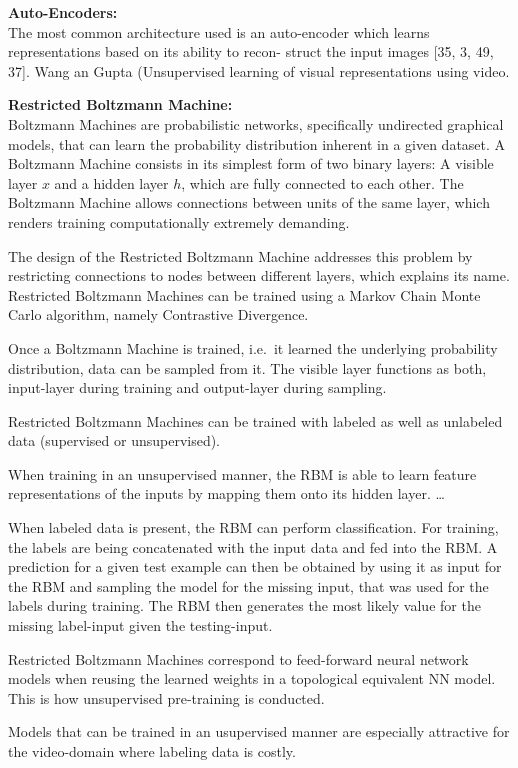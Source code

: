 \textbf{Auto-Encoders:}\\
The most common architecture used is an auto-encoder
which learns representations based on its ability to recon-
struct the input images [35, 3, 49, 37]. Wang an Gupta (Unsupervised learning of visual representations using video.

\textbf{Restricted Boltzmann Machine:}\\
Boltzmann Machines are probabilistic networks, specifically undirected graphical models, that can learn the probability distribution inherent in a given dataset.
A Boltzmann Machine consists in its simplest form of two binary layers: A visible layer $x$ and a hidden layer $h$, which are fully connected to each other.
The Boltzmann Machine allows connections between units of the same layer, which renders training computationally extremely demanding.

The design of the Restricted Boltzmann Machine addresses this problem by restricting connections to nodes between different layers, which explains its name.
Restricted Boltzmann Machines can be trained using a Markov Chain Monte Carlo algorithm, namely Contrastive Divergence.

Once a Boltzmann Machine is trained, i.e.\ it learned the underlying probability distribution, data can be sampled from it.
The visible layer functions as both, input-layer during training and output-layer during sampling.

Restricted Boltzmann Machines can be trained with labeled as well as unlabeled data (supervised or unsupervised).

When training in an unsupervised manner, the RBM is able to learn feature representations of the inputs by mapping them onto its hidden layer.
\ldots

When labeled data is present, the RBM can perform classification. 
For training, the labels are being concatenated with the input data and fed into the RBM.
A prediction for a given test example can then be obtained by using it as input for the RBM and sampling the model for the missing input, that was used for the labels during training.
The RBM then generates the most likely value for the missing label-input given the testing-input.

Restricted Boltzmann Machines correspond to feed-forward neural network models when reusing the learned weights in a topological equivalent NN model.
This is how unsupervised pre-training is conducted.

Models that can be trained in an usupervised manner are especially attractive for the video-domain where labeling data is costly.

